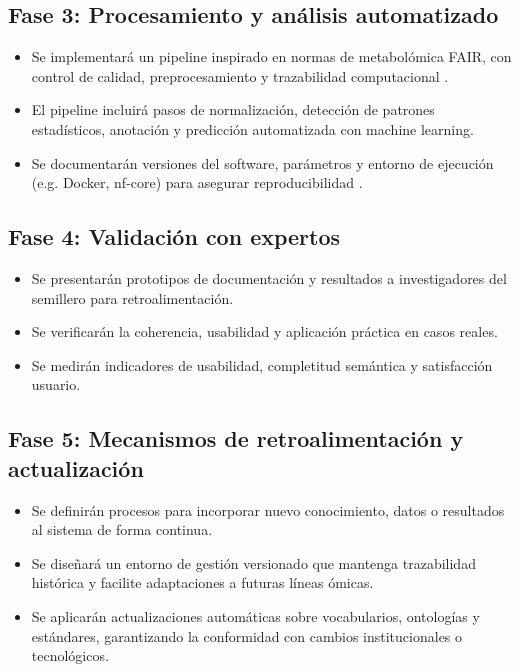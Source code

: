 \subsection{Fase 3: Procesamiento y análisis automatizado}
\begin{itemize}
  \item Se implementará un pipeline inspirado en normas de metabolómica FAIR, con control de calidad, preprocesamiento y trazabilidad computacional \cite{QualityMetabolomics} \cite{ImplementationFAIR}.
  \item El pipeline incluirá pasos de normalización, detección de patrones estadísticos, anotación y predicción automatizada con machine learning.
  \item Se documentarán versiones del software, parámetros y entorno de ejecución (e.g. Docker, nf-core) para asegurar reproducibilidad \cite{FAIR_multomics}.
\end{itemize}

\subsection{Fase 4: Validación con expertos}
\begin{itemize}
  \item Se presentarán prototipos de documentación y resultados a investigadores del semillero para retroalimentación.
  \item Se verificarán la coherencia, usabilidad y aplicación práctica en casos reales.
  \item Se medirán indicadores de usabilidad, completitud semántica y satisfacción usuario.
\end{itemize}

\subsection{Fase 5: Mecanismos de retroalimentación y actualización}
\begin{itemize}
  \item Se definirán procesos para incorporar nuevo conocimiento, datos o resultados al sistema de forma continua.
  \item Se diseñará un entorno de gestión versionado que mantenga trazabilidad histórica y facilite adaptaciones a futuras líneas ómicas.
  \item Se aplicarán actualizaciones automáticas sobre vocabularios, ontologías y estándares, garantizando la conformidad con cambios institucionales o tecnológicos.
\end{itemize}

